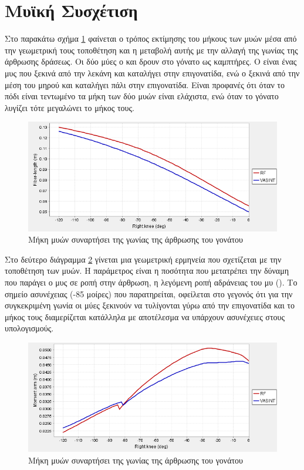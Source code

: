 \section{Μυϊκή Συσχέτιση}

Στο παρακάτω σχήμα \ref{fig:iber-length-vs-knee-angle} φαίνεται ο τρόπος εκτίμησης του μήκους των μυών μέσα από την γεωμετρική τους τοποθέτηση και η μεταβολή αυτής με την αλλαγή της γωνίας της άρθρωσης δράσεως. Οι δύο μύες ο  και  δρουν στο γόνατο ως καμπτήρες. Ο  είναι ένας μυς που ξεκινά από την λεκάνη και καταλήγει στην επιγονατίδα, ενώ  ο  ξεκινά από την μέση του μηρού και καταλήγει πάλι στην επιγονατίδα. Είναι προφανές ότι όταν το πόδι είναι τεντωμένο τα μήκη των δύο μυών είναι ελάχιστα, ενώ όταν το γόνατο λυγίζει τότε μεγαλώνει το μήκος τους.

\begin{figure}[H]
    \centering
    \includegraphics[width=0.8\linewidth, keepaspectratio]{fig/fiber-length-vs-knee-angle.png}
    \caption{Μήκη μυών συναρτήσει της γωνίας της άρθρωσης του γονάτου}
    \label{fig:iber-length-vs-knee-angle}
\end{figure}

Στο δεύτερο διάγραμμα \ref{fig:moment-arm-vs-knee-angle} γίνεται μια γεωμετρική ερμηνεία που σχετίζεται με την τοποθέτηση των μυών. Η παράμετρος είναι η ποσότητα που μετατρέπει την δύναμη που παράγει ο μυς σε ροπή στην άρθρωση, η λεγόμενη ροπή αδράνειας του μυ (). Το σημείο ασυνέχειας (-85 μοίρες) που παρατηρείται, οφείλεται στο γεγονός ότι για την συγκεκριμένη γωνία οι μύες ξεκινούν να τυλίγονται γύρω από την επιγονατίδα και το μήκος τους διαμερίζεται κατάλληλα με αποτέλεσμα να υπάρχουν ασυνέχειες στους υπολογισμούς.

\begin{figure}[H]
    \centering
    \includegraphics[width=0.8\linewidth, keepaspectratio]{fig/moment-arm-vs-knee-angle.png}
    \caption{Μήκη μυών συναρτήσει της γωνίας της άρθρωσης του γονάτου}
    \label{fig:moment-arm-vs-knee-angle}
\end{figure}

